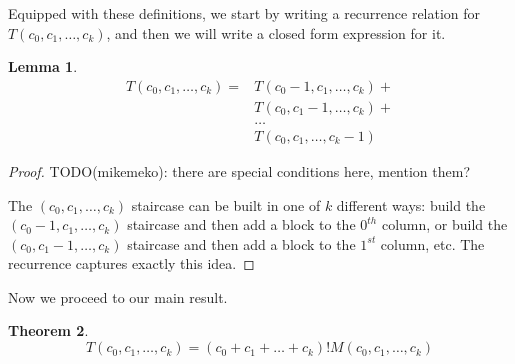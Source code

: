 \documentclass[12pt]{amsart}
\newtheorem{theorem}{Theorem}[section]
\newtheorem{lemma}[theorem]{Lemma}
\newcommand{\M}{M}
\begin{document}
Equipped with these definitions, we start by writing a recurrence relation for $T(c_0, c_1, \dots, c_k)$, and then we will write a closed form expression for it.
\begin{lemma}
\begin{align*}
T(c_0, c_1, \dots, c_k) = & T(c_0-1, c_1, \dots, c_k) + \\
&  T(c_0, c_1-1, \dots, c_k) + \\
& \dots \\
& T(c_0, c_1, \dots, c_k-1)
\end{align*}
\label{lem:recurrence}
\end{lemma}

\begin{proof}
TODO(mikemeko): there are special conditions here, mention them?

The $(c_0, c_1, \dots, c_k)$ staircase can be built in one of $k$ different ways: build the $(c_0-1, c_1, \dots, c_k)$ staircase and then add a block to the $0^{th}$ column, or build the $(c_0, c_1-1, \dots, c_k)$ staircase and then add a block to the $1^{st}$ column, etc. The recurrence captures exactly this idea.
\end{proof}

Now we proceed to our main result.

\begin{theorem}
$$
T(c_0, c_1, \dots, c_k) = (c_0 + c_1 + \dots + c_k)! \M(c_0, c_1, \dots, c_k)
$$
\end{theorem}
\end{document}
